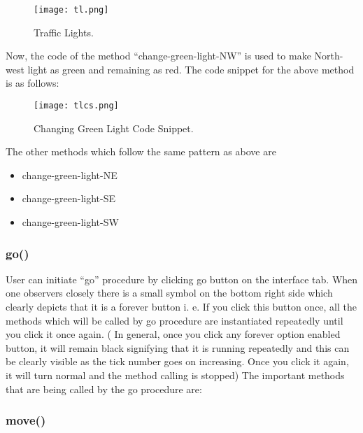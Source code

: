 \documentclass[11pt,a4paper]{article}
\begin{document}
\begin{figure}[!ht]
\centering
\texttt{[image: tl.png]}
\caption{\label{fig:tl}Traffic Lights.}
\end{figure}

Now, the code of the method “change-green-light-NW” is used to make North-west light as green and remaining as red. The code snippet for the above method is as follows:

\begin{figure}[!ht]
\centering
\texttt{[image: tlcs.png]}
\caption{\label{fig:tlcs}Changing Green Light Code Snippet.}
\end{figure}
                                       
 The other methods which follow the same pattern as above are 
\begin{itemize}
\item change-green-light-NE
\item change-green-light-SE
\item change-green-light-SW
\end{itemize}



\subsubsection{\textbf{go()}}

User can initiate “go” procedure by clicking go button on the interface tab. When one observers closely there is a small symbol on the bottom right side which clearly depicts that it is a forever button i. e. If you click this button once, all the methods which will be called by go procedure are instantiated repeatedly until you click it once again. ( In general, once you click any forever option enabled button, it will remain black signifying that it is running repeatedly and this can be clearly visible as the tick number goes on increasing. Once you click it again, it will turn normal and the method calling is stopped)\newline
The important methods that are being called by the go procedure are:


\subsubsection{\textbf{move()}}
\end{document}

